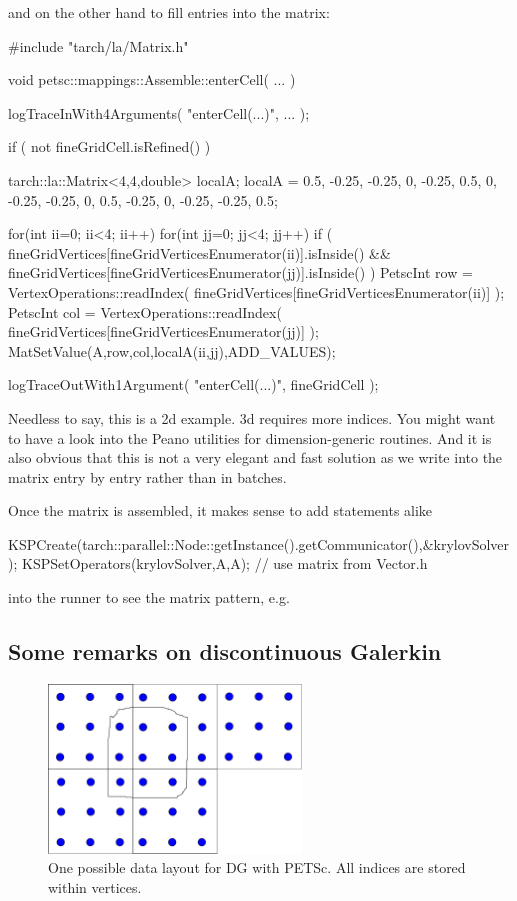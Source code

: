 \noindent
and on the other hand to fill entries into the matrix:
\begin{code}
#include "tarch/la/Matrix.h"


void petsc::mappings::Assemble::enterCell(
  ...
) {
 logTraceInWith4Arguments( "enterCell(...)", ... );

 if ( not fineGridCell.isRefined() ) {
  tarch::la::Matrix<4,4,double> localA;
  localA = 0.5,  -0.25, -0.25, 0,
           -0.25, 0.5,  0,    -0.25,
           -0.25, 0,    0.5,  -0.25,
           0,    -0.25, -0.25, 0.5;

  for(int ii=0; ii<4; ii++)
  for(int jj=0; jj<4; jj++) {
   if (
    fineGridVertices[fineGridVerticesEnumerator(ii)].isInside()
    &&
    fineGridVertices[fineGridVerticesEnumerator(jj)].isInside()
   ) {
    PetscInt row = VertexOperations::readIndex( fineGridVertices[fineGridVerticesEnumerator(ii)] );
    PetscInt col = VertexOperations::readIndex( fineGridVertices[fineGridVerticesEnumerator(jj)] );
    MatSetValue(A,row,col,localA(ii,jj),ADD_VALUES);
   }
  }
 }

 logTraceOutWith1Argument( "enterCell(...)", fineGridCell );
}
\end{code}

\noindent
Needless to say, this is a 2d example. 3d requires more indices. You might want
to have a look into the Peano utilities for dimension-generic routines. And it
is also obvious that this is not a very elegant and fast solution as we write
into the matrix entry by entry rather than in batches.

Once the matrix is assembled, it makes sense to add statements alike
\begin{code}
  KSPCreate(tarch::parallel::Node::getInstance().getCommunicator(),&krylovSolver);
  KSPSetOperators(krylovSolver,A,A); // use matrix from Vector.h
\end{code}

\noindent
into the runner to see the matrix pattern, e.g.



\subsection{Some remarks on discontinuous Galerkin}


\begin{figure}
  \begin{center}
    \includegraphics[width=0.6\textwidth]{43_dg/dg-data-layout.pdf}
  \end{center}
  \caption{One possible data layout for DG with PETSc. All indices are stored
  within vertices.}
  \label{figure:43_petsc:data-layout}
\end{figure}


